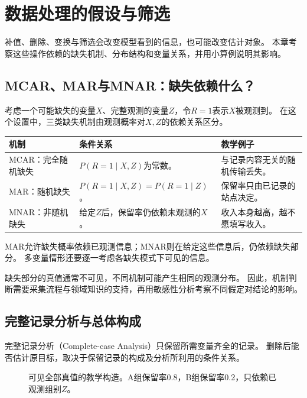 \chapter{数据处理的假设与筛选}
\label{ch:reliability}

补值、删除、变换与筛选会改变模型看到的信息，也可能改变估计对象。
本章考察这些操作依赖的缺失机制、分布结构和变量关系，并用小算例说明其影响。

\section{MCAR、MAR与MNAR：缺失依赖什么？}
\label{sec:reliability-mechanism}
考虑一个可能缺失的变量$X$、完整观测的变量$Z$，令$R=1$表示$X$被观测到。
在这个设置中，三类缺失机制由观测概率对$X,Z$的依赖关系区分。

\begin{center}
\begin{tabularx}{\textwidth}{P{29mm}P{64mm}Y}
\toprule
机制 & 条件关系 & 教学例子\\
\midrule
MCAR：完全随机缺失 & $P(R=1\mid X,Z)$为常数。 & 与记录内容无关的随机传输丢失。\\
MAR：随机缺失 & $P(R=1\mid X,Z)=P(R=1\mid Z)$。 & 保留率只由已记录的站点决定。\\
MNAR：非随机缺失 & 给定$Z$后，保留率仍依赖未观测的$X$。 & 收入本身越高，越不愿填写收入。\\
\bottomrule
\end{tabularx}
\end{center}

MAR允许缺失概率依赖已观测信息；MNAR则在给定这些信息后，仍依赖缺失部分。
多变量情形还要逐一考虑各缺失模式下可见的信息。

\begin{pitfall}[缺失机制的识别]
缺失部分的真值通常不可见，不同机制可能产生相同的观测分布。
因此，机制判断需要采集流程与领域知识的支持，再用敏感性分析考察不同假定对结论的影响。
\end{pitfall}


\section{完整记录分析与总体构成}
\label{sec:reliability-deletion}
完整记录分析（Complete-case Analysis）只保留所需变量齐全的记录。
删除后能否估计原目标，取决于保留记录的构成及分析所利用的条件关系。

\begin{figure}[htbp]
\centering
\caption{可见全部真值的教学构造。A组保留率0.8，B组保留率0.2，只依赖已观测组别$Z$。}
\par\smallskip
{}
\end{figure}


